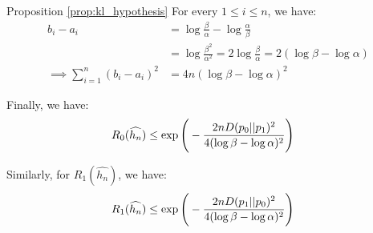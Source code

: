 \begin{proof*}{Proposition \ref{prop:kl_hypothesis}}
    \noindent For every $1 \le i \le n$, we have:
    \begin{align*}
        b_i - a_i &= \log\frac{\beta}{\alpha} - \log\frac{\alpha}{\beta} \\
            &= \log\frac{\beta^2}{\alpha^2} = 2\log\frac{\beta}{\alpha} = 2(\log\beta - \log\alpha)\\
        \implies \sum_{i=1}^n (b_i - a_i)^2 &= 4n(\log\beta - \log\alpha)^2
    \end{align*}

    \noindent Finally, we have:
    \begin{align*}
        R_0(\widehat{h_n}) 
            &\le \exp\Bigg( 
                -\frac{2nD(p_0||p_1)^2}{4(\log\beta - \log\alpha)^2}
             \Bigg)
    \end{align*}

    \noindent Similarly, for $R_1(\widehat{h_n})$, we have:
    \begin{align*}
        R_1(\widehat{h_n}) 
            &\le \exp\Bigg( 
                -\frac{2nD(p_1||p_0)^2}{4(\log\beta - \log\alpha)^2}
             \Bigg)
    \end{align*}
\end{proof*}

\newpage


